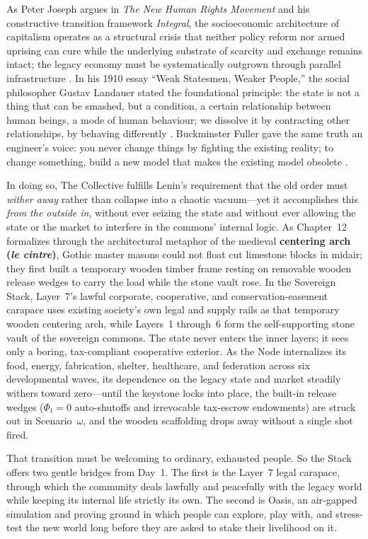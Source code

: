 As Peter Joseph argues in \textit{The New Human Rights Movement} and his constructive transition framework \textit{Integral}, the socioeconomic architecture of capitalism operates as a structural crisis that neither policy reform nor armed uprising can cure while the underlying substrate of scarcity and exchange remains intact; the legacy economy must be systematically outgrown through parallel infrastructure \parencite{joseph2017new,joseph_integral}. In his 1910 essay ``Weak Statesmen, Weaker People,'' the social philosopher Gustav Landauer stated the foundational principle: the state is not a thing that can be smashed, but a condition, a certain relationship between human beings, a mode of human behaviour; we dissolve it by contracting other relationships, by behaving differently \parencite{landauer2010}. Buckminster Fuller gave the same truth an engineer's voice: you never change things by fighting the existing reality; to change something, build a new model that makes the existing model obsolete \parencite{fuller1981}.

In doing so, The Collective fulfills Lenin's requirement that the old order must \textit{wither away} rather than collapse into a chaotic vacuum---yet it accomplishes this \textit{from the outside in}, without ever seizing the state and without ever allowing the state or the market to interfere in the commons' internal logic. As Chapter~12 formalizes through the architectural metaphor of the medieval \textbf{centering arch (\textit{le cintre})}, Gothic master masons could not float cut limestone blocks in midair; they first built a temporary wooden timber frame resting on removable wooden release wedges to carry the load while the stone vault rose. In the Sovereign Stack, Layer~7's lawful corporate, cooperative, and conservation-easement carapace uses existing society's own legal and supply rails as that temporary wooden centering arch, while Layers~1 through~6 form the self-supporting stone vault of the sovereign commons. The state never enters the inner layers; it sees only a boring, tax-compliant cooperative exterior. As the Node internalizes its food, energy, fabrication, shelter, healthcare, and federation across six developmental waves, its dependence on the legacy state and market steadily withers toward zero---until the keystone locks into place, the built-in release wedges ($\Phi_t = 0$ auto-shutoffs and irrevocable tax-escrow endowments) are struck out in Scenario~$\omega$, and the wooden scaffolding drops away without a single shot fired.

That transition must be welcoming to ordinary, exhausted people. So the Stack offers two gentle bridges from Day~1. The first is the Layer~7 legal carapace, through which the community deals lawfully and peacefully with the legacy world while keeping its internal life strictly its own. The second is Oasis, an air-gapped simulation and proving ground in which people can explore, play with, and stress-test the new world long before they are asked to stake their livelihood on it.

